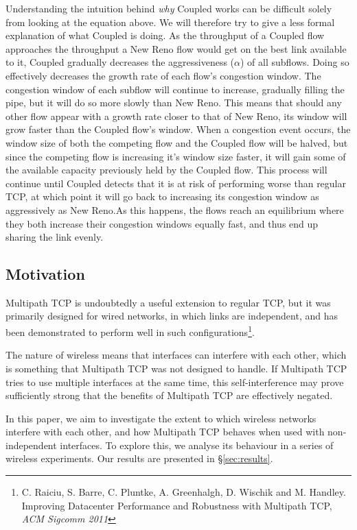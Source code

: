 Understanding the intuition behind \textit{why} Coupled works can be difficult
solely from looking at the equation above. We will therefore try to give a less
formal explanation of what Coupled is doing. As the throughput of a Coupled flow
approaches the throughput a New Reno flow would get on the best link available
to it, Coupled gradually decreases the aggressiveness ($\alpha$) of all
subflows. Doing so effectively decreases the growth rate of each flow's
congestion window. The congestion window of each subflow will continue to
increase, gradually filling the pipe, but it will do so more slowly than New
Reno. This means that should any other flow appear with a growth rate closer to
that of New Reno, its window will grow faster than the Coupled flow's window.
When a congestion event occurs, the window size of both the competing flow and
the Coupled flow will be halved, but since the competing flow is increasing it's
window size faster, it will gain some of the available capacity previously held
by the Coupled flow. This process will continue until Coupled detects that it is
at risk of performing worse than regular TCP, at which point it will go back to
increasing its congestion window as aggressively as New Reno.\@ As this happens,
the flows reach an equilibrium where they both increase their congestion windows
equally fast, and thus end up sharing the link evenly.

\subsection{Motivation}
\label{sec:bg:motivation}
Multipath TCP is undoubtedly a useful extension to regular TCP, but it was
primarily designed for wired networks, in which links are independent, and has
been demonstrated to perform well in such configurations\footnote{C. Raiciu, S.
 Barre, C. Pluntke, A. Greenhalgh, D. Wischik and M. Handley. Improving
 Datacenter Performance and Robustness with Multipath TCP, \textit{ACM Sigcomm
2011}}.

The nature of wireless means that interfaces can interfere with each other,
which is something that Multipath TCP was not designed to handle. If Multipath
TCP tries to use multiple interfaces at the same time, this self-interference
may prove sufficiently strong that the benefits of Multipath TCP are effectively
negated.

In this paper, we aim to investigate the extent to which wireless networks
interfere with each other, and how Multipath TCP behaves when used with
non-independent interfaces. To explore this, we analyse its behaviour in a
series of wireless experiments. Our results are presented in
\S\ref{sec:results}.
